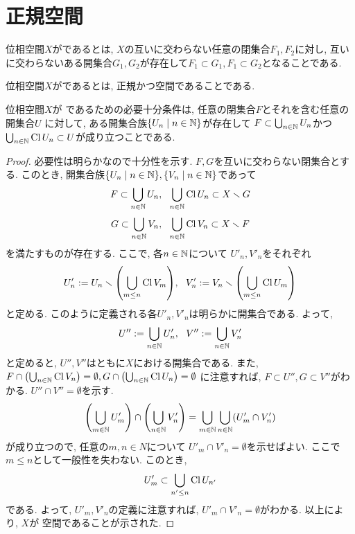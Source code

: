 \documentclass[uplatex, dvipdfmx, a4paper, 12pt, class=jsbook, crop=false]{standalone}
\begin{document}
\section{正規空間}
\label{sec:normal-spaces}

\begin{definition}
	位相空間$ X $がであるとは, $ X $の互いに交わらない任意の閉集合$ F_1, F_2 $に対し, 互いに交わらないある開集合$ G_1, G_2 $が存在して$ F_1 \subset G_1, F_1 \subset G_2 $となることである.
\end{definition}

\begin{definition}
	位相空間$ X $がであるとは,
	正規かつ空間であることである.
\end{definition}

\begin{theorem}
	\label{thm:t400001}
	位相空間\( X \)が  であるための必要十分条件は,
	任意の閉集合\( F \)とそれを含む任意の開集合\( U \)
	に対して, ある開集合族\( \setcomp{U_n}{n \in \N} \)が存在して
	\( F \subset \bigcup_{n \in \mathbb{N}} U_n \)かつ
	\( \bigcup_{n \in \mathbb{N}} \mathop{\mathrm{Cl}}\nolimits U_n \subset U \)が成り立つことである.
\end{theorem}

\begin{proof}
	必要性は明らかなので十分性を示す.
	\( F, G \)を互いに交わらない閉集合とする.
	このとき, 開集合族\( \setcomp{U_n}{n \in \N},
	\setcomp{V_n}{n \in \N} \)であって
	\[ F \subset \bigcup_{n \in \mathbb{N}} U_n,
	\ \ \bigcup_{n \in \mathbb{N}} \mathop{\mathrm{Cl}}\nolimits U_n \subset X \smallsetminus G \]
	\[ G \subset \bigcup_{n \in \mathbb{N}} V_n,
	\ \ \bigcup_{n \in \mathbb{N}} \mathop{\mathrm{Cl}}\nolimits V_n \subset X \smallsetminus F \]
	を満たすものが存在する.
	ここで, 各\( n \in \mathbb{N} \)について
	\( U'_n, V'_n \)をそれぞれ
	\[ U'_n \defeq U_n \setminus \lrparen{\bigcup_{m \leq n} \topcl V_m},
	\ \ V'_n \defeq V_n \setminus \lrparen{\bigcup_{m \leq n} \topcl U_m} \]
	と定める.
	このように定義される各\( U'_n, V'_n \)は明らかに開集合である.
	よって,
	\[ U'' \mathrel{:=} \bigcup_{n \in \mathbb{N}} U'_n,
	\ \ V'' \mathrel{:=} \bigcup_{n \in \mathbb{N}} V'_n \]
	と定めると, \( U'', V'' \)はともに\( X \)における開集合である.
	また, \( F \cap \lrparen{\bigcup_{n \in \N} \topcl V_n}= \emptyset,
	G \cap \lrparen{\bigcup_{n \in \N} \topcl U_n} = \emptyset \)
	に注意すれば, \( F \subset U'', G \subset V'' \)がわかる.
	\( U'' \cap V'' = \emptyset \)を示す.
	\[ \lrparen{\bigcup_{m\in \N} U'_m}
	\cap \lrparen{\bigcup_{n\in \N} V'_n}
	= \bigcup_{m \in \N} \bigcup_{n \in \N} \lrparen{U'_m \cap V'_n} \]
	が成り立つので, 任意の\( m, n \in N \)について
	\( U'_m \cap V'_n = \emptyset \)を示せばよい.
	ここで\( m \leq n \)として一般性を失わない.
	このとき,
	\[ U'_m \subset \bigcup_{n' \leq n} \mathop{\mathrm{Cl}}\nolimits U_{n'} \]
	である.  よって, \( U'_m, V'_n \)の定義に注意すれば,
	\( U'_m \cap V'_n = \emptyset \)がわかる.
	以上により, \( X \)が  空間であることが示された.
\end{proof}
\end{document}
